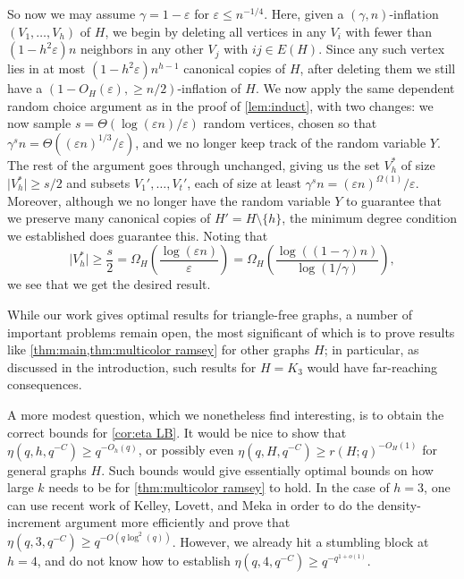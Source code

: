 \documentclass[11pt]{article}
\numberwithin{equation}{section}
\theoremstyle{plain}
\theoremstyle{remark}
\newcommand{\eps}{\ensuremath{\varepsilon}}
\newcommand\ab[1]{\lvert #1 \rvert}
\begin{document}
So now we may assume $\gamma = 1-\eps $ for $ \eps \le n^{-1/4}$. Here, given a $(\gamma,n)$-inflation $(V_1,\dots,V_h)$ of $H$, we begin by deleting all vertices in any $V_i$ with fewer than $(1-h^2\eps)n$ neighbors in any other $V_j$ with $ij \in E(H)$. Since any such vertex lies in at most $(1-h^2\eps) n^{h-1}$ canonical copies of $H$, after deleting them we still have a $(1-O_H(\eps), \geq n/2)$-inflation of $H$. We now apply the same dependent random choice argument as in the proof of \cref{lem:induct}, with two changes: we now sample $s = \Theta(\log(\eps n)/\eps)$ random vertices, chosen so that $\gamma^s n = \Theta((\eps n)^{1/3}/\eps)$, and we no longer keep track of the random variable $Y$. The rest of the argument goes through unchanged, giving us the set $V_h^*$ of size $\ab{V_h^*}\geq s/2$ and subsets $V_1',\dots,V_t'$, each of size at least $\gamma^s n = (\eps n)^{\Omega(1)}/\eps$. Moreover, although we no longer have the random variable $Y$ to guarantee that we preserve many canonical copies of $H' = H \setminus \{h\}$, the minimum degree condition we established does guarantee this. Noting that
\[
\ab{V_h^*} \geq \frac s2 = \Omega_H \left(\frac{\log(\eps n)}{\eps}\right) = \Omega_H \left( \frac{\log((1-\gamma)n)}{\log(1/\gamma)}\right),
\]
we see that we get the desired result.

While our work gives optimal results for triangle-free graphs, a number of important problems remain open,
the most significant of which is to prove results like \cref{thm:main,thm:multicolor ramsey} for other graphs $H$; in particular, as discussed in the introduction, such results for $H=K_3$ would have far-reaching consequences.

A more modest question, which we nonetheless find interesting, is to obtain the  correct bounds for \cref{cor:eta LB}. It would be nice to show that $\eta(q,h, q^{-C})\geq q^{-O_h(q)}$, or possibly even $\eta(q, H, q^{-C})\geq r(H;q)^{-O_H(1)}$ for general graphs $H$. Such bounds would give essentially optimal bounds on how large $k$ needs to be for \cref{thm:multicolor ramsey} to hold. In the case of $h=3$, one can use recent work of Kelley, Lovett, and Meka \cite{2308.12451} in order to do the density-increment argument more efficiently and prove that $\eta(q,3,q^{-C})\geq q^{-O(q\log^2(q))}$. However, we already hit a stumbling block at $h=4$, and do not know how to establish $\eta(q,4,q^{-C})\geq q^{-q^{1+o(1)}}$.
\end{document}
